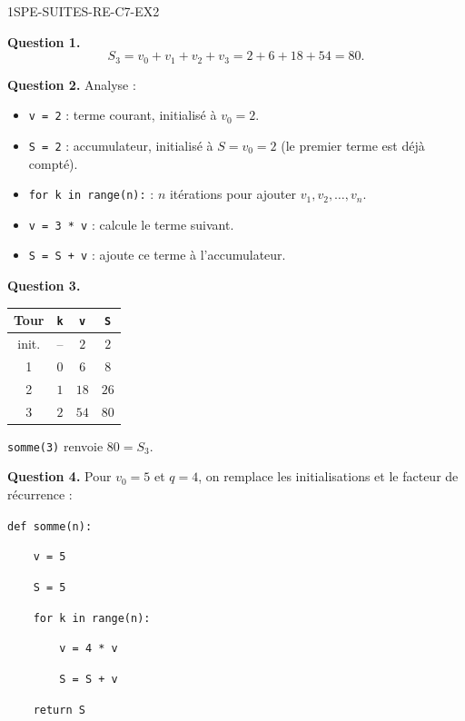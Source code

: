 \begin{corrige}{1SPE-SUITES-RE-C7-EX2}

\textbf{Question 1.}
\[
S_3 = v_0 + v_1 + v_2 + v_3 = 2 + 6 + 18 + 54 = 80.
\]

\textbf{Question 2.} Analyse :
\begin{itemize}
  \item \texttt{v = 2} : terme courant, initialisé à $v_0 = 2$.
  \item \texttt{S = 2} : accumulateur, initialisé à $S = v_0 = 2$ (le premier terme est déjà compté).
  \item \texttt{for k in range(n):} : $n$ itérations pour ajouter $v_1, v_2, \ldots, v_n$.
  \item \texttt{v = 3 * v} : calcule le terme suivant.
  \item \texttt{S = S + v} : ajoute ce terme à l'accumulateur.
\end{itemize}


\textbf{Question 3.}

\begin{center}
\begin{tabular}{|c|c|c|c|}
\hline
Tour & \texttt{k} & \texttt{v} & \texttt{S} \\
\hline
init. & -- & $2$ & $2$ \\
1 & $0$ & $6$ & $8$ \\
2 & $1$ & $18$ & $26$ \\
3 & $2$ & $54$ & $80$ \\
\hline
\end{tabular}
\end{center}

\texttt{somme(3)} renvoie $80 = S_3$. \checkmark

\textbf{Question 4.} Pour $v_0 = 5$ et $q = 4$, on remplace les initialisations et le facteur de récurrence :

\medskip
\verb|def somme(n):|

\verb|    v = 5|

\verb|    S = 5|

\verb|    for k in range(n):|

\verb|        v = 4 * v|

\verb|        S = S + v|

\verb|    return S|

\end{corrige}


